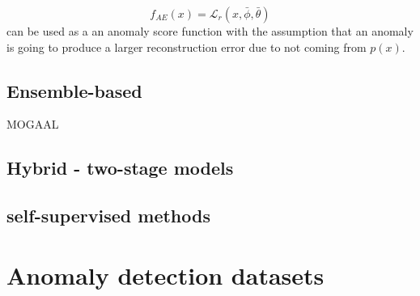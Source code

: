 \begin{equation}
f_{AE}(x)=\mathcal{L}_{r}(x,\bar{\phi},\bar{\theta})\label{eq:ae_score}
\end{equation}
can be used as a an anomaly score function with the assumption that
an anomaly is going to produce a larger reconstruction error due to
not coming from $p(x)$.


\subsection{Ensemble-based}

MOGAAL

\subsection{Hybrid - two-stage models}

\subsection{self-supervised methods}

\section{Anomaly detection datasets}
